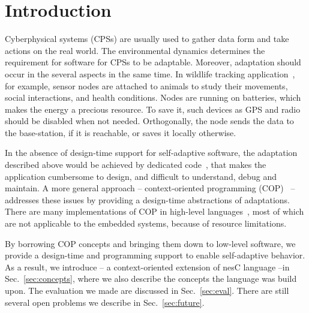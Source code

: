 \section{Introduction}

Cyberphysical systems (CPSs) are usually used to gather data form and take
actions on the real world. The environmental dynamics determines the requirement
for software for CPSs to be adaptable. Moreover, adaptation should occur in the
several aspects in the same time. In wildlife tracking
application~\cite{pasztor10:selective}, for example, sensor nodes are attached
to animals to study their movements, social interactions, and health conditions.
Nodes are running on batteries, which makes the energy a precious resource. To
save it, such devices as GPS and radio should be disabled when not needed.
Orthogonally, the node sends the data to the base-station, if it is reachable,
or saves it locally otherwise.

In the absence of design-time support for self-adaptive software, the adaptation
described above would be achieved by dedicated
code~\cite{Zimmerling12,Bourdenas11}, that makes the application cumbersome to
design, and difficult to understand, debug and maintain. A more general approach
-- context-oriented programming (COP)~\cite{Hirschfeld08} -- addresses these
issues by providing a design-time abstractions of adaptations. There are many
implementations of COP in high-level
languages~\cite{Ghezzi10,Salvaneschi12,Sehic11}, most of which are not
applicable to the embedded systems, because of resource limitations.


By borrowing COP concepts and bringing them down to low-level software, we
provide a design-time and programming support to enable self-adaptive behavior.
As a result, we introduce \conesc -- a context-oriented extension of nesC
language --in Sec.~\ref{sec:concepts}, where we also describe the concepts the
language was build upon. The evaluation we made are discussed in
Sec.~\ref{sec:eval}. There are still several open problems we describe in
Sec.~\ref{sec:future}.
